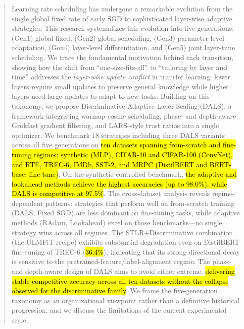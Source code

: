 \documentclass[a4paper,fleqn]{cas-dc}
\begin{document}
\begin{abstract}
Learning rate scheduling has undergone a remarkable evolution from the single global fixed rate of early SGD to sophisticated layer-wise adaptive strategies. This research systematizes this evolution into five generations: (Gen1) global fixed, (Gen2) global scheduling, (Gen3) parameter-level adaptation, (Gen4) layer-level differentiation, and (Gen5) joint layer-time scheduling. We trace the fundamental motivation behind each transition, showing how the shift from ``one-size-fits-all'' to ``tailoring by layer and time'' addresses the \emph{layer-wise update conflict} in transfer learning: lower layers require small updates to preserve general knowledge while higher layers need large updates to adapt to new tasks. Building on this taxonomy, we propose Discriminative Adaptive Layer Scaling (DALS), a framework integrating warmup-cosine scheduling, phase- and depth-aware Grokfast gradient filtering, and LARS-style trust ratios into a single optimizer. We benchmark 18 strategies including three DALS variants across all five generations on \hl{ten datasets spanning from-scratch and fine-tuning regimes: synthetic (MLP), CIFAR-10 and CIFAR-100 (ConvNet), and RTE, TREC-6, IMDb, SST-2, and MRPC (DistilBERT and BERT-base, fine-tune)}. On the synthetic controlled benchmark, \hl{the adaptive and lookahead methods achieve the highest accuracies (up to 98.0\%), while DALS is competitive at 97.5\%}. The cross-dataset analysis reveals regime-dependent patterns: strategies that perform well on from-scratch training (DALS, Fixed SGD) are less dominant on fine-tuning tasks, while adaptive methods (RAdam, Lookahead) excel on those benchmarks---no single strategy wins across all regimes. The STLR+Discriminative combination (the ULMFiT recipe) exhibits substantial degradation even on DistilBERT fine-tuning of TREC-6 (\hl{36.4\%}), indicating that its strong directional decay is sensitive to the pretrained-feature/label-alignment regime. The phase- and depth-aware design of DALS aims to avoid either extreme, \hl{delivering stable competitive accuracy across all ten datasets without the collapse observed for the discriminative family}. We frame the five-generation taxonomy as an organizational viewpoint rather than a definitive historical progression, and we discuss the limitations of the current experimental scale.
\end{abstract}
\end{document}
